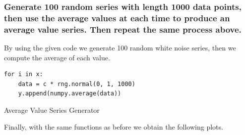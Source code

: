 \documentclass{article}
\begin{document}
\subsubsection{Generate 100 random series with length 1000 data points, then use the average
 values at each time to produce an average value series. Then repeat the same
 process above.}
 By using the given code we generate 100 random white noise series, then we compute the average of each value.
 \begin{listing}[!ht]
\begin{verbatim}
for i in x:
    data = c * rng.normal(0, 1, 1000)
    y.append(numpy.average(data))
\end{verbatim}
\caption{Average Value Series Generator}
\label{listing:gen_wn}
\end{listing}
 Finally, with the same functions as before we obtain the following plots.
\end{document}
